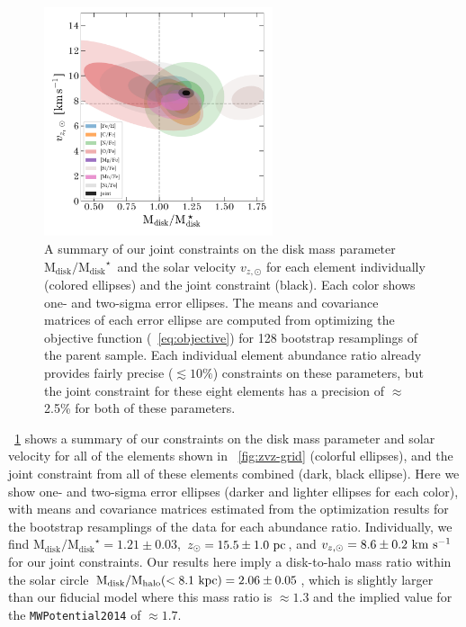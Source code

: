\documentclass[modern]{aastex63}
\newcommand{\mdisk}{\ensuremath{\mathrm{M}_\mathrm{disk}}}
\newcommand{\mratio}{\ensuremath{\mdisk / \mdisk^\star}}
\begin{document}
\begin{figure}[!tp]
  \begin{mdframed}
    \color{captiongray}
  \begin{center}
  \includegraphics[width=0.6\textwidth]{M-vz-error-ellipses.pdf}
  \end{center}
  \caption{%
    A summary of our joint constraints on the disk mass parameter \mratio\ and
    the solar velocity $v_{z, \odot}$ for each element individually (colored
    ellipses) and the joint constraint (black).
    Each color shows one- and two-sigma error ellipses.
    The means and covariance matrices of each error ellipse are computed from
    optimizing the objective function (\equationname~\ref{eq:objective}) for 128
    bootstrap resamplings of the parent sample.
    Each individual element abundance ratio already provides fairly precise
    ($\lesssim10\%$) constraints on these parameters, but the joint constraint
    for these eight elements has a precision of $\approx$2.5\% for both of these
    parameters.
  \label{fig:elem-ellipses-1}
  }
  \end{mdframed}
\end{figure}

\figurename~\ref{fig:elem-ellipses-1} shows a summary of our constraints on the
disk mass parameter and solar velocity for all of the elements shown in
\figurename~\ref{fig:zvz-grid} (colorful ellipses), and the joint constraint
from all of these elements combined (dark, black ellipse).
Here we show one- and two-sigma error ellipses (darker and lighter ellipses for
each color), with means and covariance matrices estimated from the optimization
results for the bootstrap resamplings of the data for each abundance ratio.
Individually, we find $\mratio = 1.21 \pm 0.03$, $z_\odot = 15.5 \pm 1.0~\mathrm{pc}$,
and $v_{z, \odot} = 8.6 \pm 0.2~\mathrm{km}~\mathrm{s}^{-1}$ for our joint constraints.
Our results here imply a disk-to-halo mass ratio within the solar circle ${\rm
M}_{\rm disk} / {\rm M}_{\rm halo} (<8.1~\mathrm{kpc}) = 2.06 \pm 0.05$, which is
slightly larger than our fiducial model where this mass ratio is $\approx 1.3$
\citep{gala} and the implied value for the \texttt{MWPotential2014}
\citep{Bovy:2015} of $\approx 1.7$.
\end{document}
